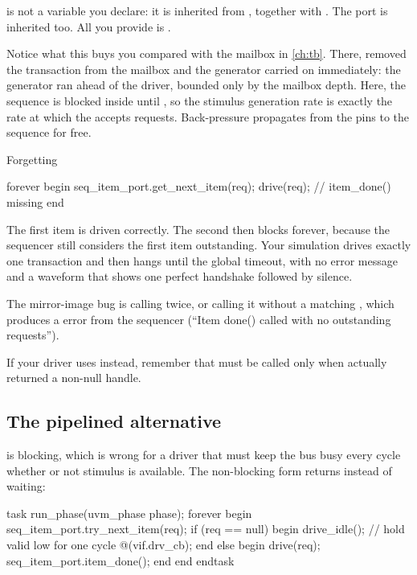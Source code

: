  is not a variable you declare: it is inherited from
, together with . The port
 is inherited too. All you provide is .

Notice what this buys you compared with the mailbox in \cref{ch:tb}. There,
 removed the transaction from the mailbox and the
generator carried on immediately: the generator ran ahead of the driver,
bounded only by the mailbox depth. Here, the sequence is blocked inside
 until , so the stimulus generation
rate is exactly the rate at which the \DUT{} accepts requests. Back-pressure
propagates from the pins to the sequence for free.

\begin{gotcha}{Forgetting }
\begin{uvmcode}
forever begin
  seq_item_port.get_next_item(req);
  drive(req);
  // item_done() missing
end
\end{uvmcode}

The first item is driven correctly. The second  then
blocks forever, because the sequencer still considers the first item
outstanding. Your simulation drives exactly one transaction and then hangs
until the global timeout, with no error message and a waveform that shows one
perfect handshake followed by silence.

The mirror-image bug is calling  twice, or calling it
without a matching , which produces a
 error from the sequencer (``Item done() called with no
outstanding requests'').

If your driver uses  instead, remember that
 must be called only when  actually
returned a non-null handle.
\end{gotcha}

\subsection{The pipelined alternative}
\label{sec:uvm:pipelined}

 is blocking, which is wrong for a driver that must
keep the bus busy every cycle whether or not stimulus is available. The
non-blocking form returns  instead of waiting:

\begin{uvmcode}[caption={A driver that never stalls the bus},label={lst:uvm:try-next}]
task run_phase(uvm_phase phase);
  forever begin
    seq_item_port.try_next_item(req);
    if (req == null) begin
      drive_idle();          // hold valid low for one cycle
      @(vif.drv_cb);
    end else begin
      drive(req);
      seq_item_port.item_done();
    end
  end
endtask
\end{uvmcode}

